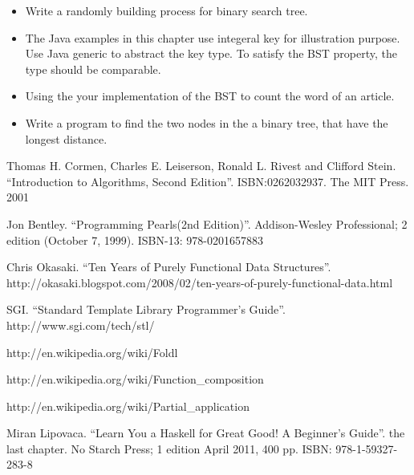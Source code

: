 \documentclass{article}
\begin{document}
\begin{Exercise}

\begin{itemize}
\item Write a randomly building process for binary search tree.
\item The Java examples in this chapter use integeral key for illustration purpose. Use Java generic to abstract the key type. To satisfy the BST property, the type should be comparable.
\item Using the your implementation of the BST to count the word of an article.
\item Write a program to find the two nodes in the a binary tree, that have the longest distance.
\end{itemize}

\end{Exercise}

\ifx\wholebook\relax \else
\begin{thebibliography}{99}

Thomas H. Cormen, Charles E. Leiserson, Ronald L. Rivest and Clifford Stein.
``Introduction to Algorithms, Second Edition''. ISBN:0262032937. The MIT Press. 2001

Jon Bentley. ``Programming Pearls(2nd Edition)''. Addison-Wesley Professional; 2 edition (October 7, 1999). ISBN-13: 978-0201657883

Chris Okasaki. ``Ten Years of Purely Functional Data Structures''. http://okasaki.blogspot.com/2008/02/ten-years-of-purely-functional-data.html

SGI. ``Standard Template Library Programmer's Guide''. http://www.sgi.com/tech/stl/


http://en.wikipedia.org/wiki/Foldl

http://en.wikipedia.org/wiki/Function\_composition

http://en.wikipedia.org/wiki/Partial\_application

Miran Lipovaca. ``Learn You a Haskell for Great Good! A Beginner's Guide''. the last chapter. No Starch Press; 1 edition April 2011, 400 pp. ISBN: 978-1-59327-283-8

\end{thebibliography}
\end{document}
